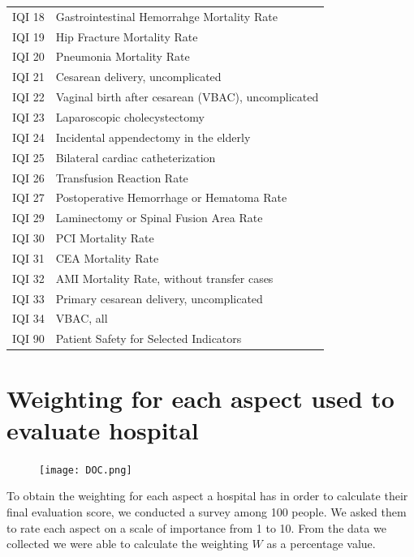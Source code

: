 \documentclass{article}
\begin{document}
\begin{appendix}
\begin{center}
{\begin{longtable}{l| l{800pt}}
        IQI 18 & Gastrointestinal Hemorrahge Mortality Rate\\
        IQI 19 & Hip Fracture Mortality Rate\\
        IQI 20 & Pneumonia Mortality Rate\\
        IQI 21 & Cesarean delivery, uncomplicated\\
        IQI 22 & Vaginal birth after cesarean (VBAC), uncomplicated\\
        IQI 23 & Laparoscopic cholecystectomy\\
        IQI 24 & Incidental appendectomy in the elderly\\
        IQI 25 & Bilateral cardiac catheterization\\
        IQI 26 & Transfusion Reaction Rate\\
        IQI 27 & Postoperative Hemorrhage or Hematoma Rate\\
        IQI 29 & Laminectomy or Spinal Fusion Area Rate\\
        IQI 30 & PCI Mortality Rate\\
        IQI 31 & CEA Mortality Rate\\
        IQI 32 & AMI Mortality Rate, without transfer cases\\
        IQI 33 & Primary cesarean delivery, uncomplicated\\
        IQI 34 & VBAC, all\\
        IQI 90 & Patient Safety for Selected Indicators\\
    \end{longtable}}
    \label{tab:symbol_def}
    
\end{center}

\newpage
\section{Weighting for each aspect used to evaluate hospital}

\begin{figure}[htbp]
        \centering
        \texttt{[image: DOC.png]}
\end{figure}

\newpage
To obtain the weighting for each aspect a hospital has in order to calculate their final evaluation score, we conducted a survey among 100 people. We asked them to rate each aspect on a scale of importance from 1 to 10. From the data we collected we were able to calculate the weighting $W$ as a percentage value. 


\end{appendix}
\end{document}
